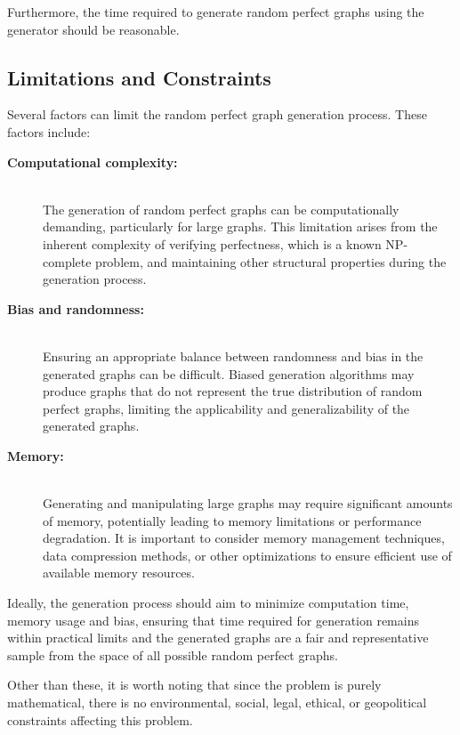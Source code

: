 Furthermore, the time required to generate random perfect graphs using the generator should be reasonable.

\subsection{Limitations and Constraints}

Several factors can limit the random perfect graph generation process. These factors include:

\begin{description}
\item [\textbf{Computational complexity:}] \hfill \\
The generation of random perfect graphs can be computationally demanding, particularly for large graphs. This limitation arises from the inherent complexity of verifying perfectness, which is a known NP-complete problem, and maintaining other structural properties during the generation process.

\item [\textbf{Bias and randomness:}] \hfill \\
Ensuring an appropriate balance between randomness and bias in the generated graphs can be difficult. Biased generation algorithms may produce graphs that do not represent the true distribution of random perfect graphs, limiting the applicability and generalizability of the generated graphs.

\item [\textbf{Memory:}] \hfill \\
Generating and manipulating large graphs may require significant amounts of memory, potentially leading to memory limitations or performance degradation. It is important to consider memory management techniques, data compression methods, or other optimizations to ensure efficient use of available memory resources. 
\end{description}

Ideally, the generation process should aim to minimize computation time, memory usage and bias, ensuring that time required for generation remains within practical limits and the generated graphs are a fair and representative sample from the space of all possible random perfect graphs.

Other than these, it is worth noting that since the problem is purely mathematical, there is no environmental, social, legal, ethical, or geopolitical constraints affecting this problem.

